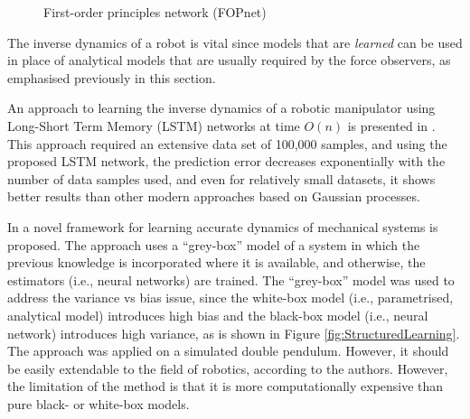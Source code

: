 \begin{figure}
    \centering
    \hfill
    \caption[First-order principles network (FOPnet)]{First-order principles network (FOPnet) \cite{Ledezma2017}}
    \label{fig:FOP}
\end{figure}

The inverse dynamics of a robot is vital since models that are \emph{learned} can be used in place of analytical models that are usually required by the force observers, as emphasised previously in this section. 

An approach to learning the inverse dynamics of a robotic manipulator using Long-Short Term Memory (LSTM) networks at time $O(n)$ is presented in \cite{Rueckert2017}. This approach required an extensive data set of 100,000 samples, and using the proposed LSTM network, the prediction error decreases exponentially with the number of data samples used, and even for relatively small datasets, it shows better results than other modern approaches based on Gaussian processes. 

In \cite{Gupta2019} a novel framework for learning accurate dynamics of mechanical systems is proposed. The approach uses a ``grey-box'' model of a system in which the previous knowledge is incorporated where it is available, and otherwise, the estimators (i.e., neural networks) are trained. The ``grey-box'' model was used to address the variance vs bias issue, since the white-box model (i.e., parametrised, analytical model) introduces high bias and the black-box model (i.e., neural network) introduces high variance, as is shown in Figure \ref{fig:StructuredLearning}. The approach was applied on a simulated double pendulum. However, it should be easily extendable to the field of robotics, according to the authors. However, the limitation of the method is that it is more computationally expensive than pure black- or white-box models.

